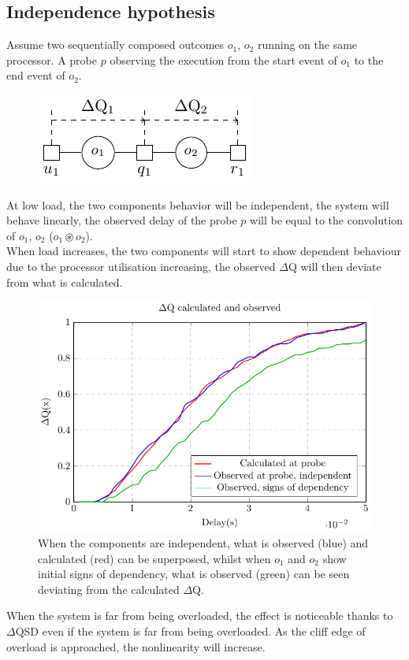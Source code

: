     \subsection{Independence hypothesis}
        
        Assume two sequentially composed outcomes $o_1$, $o_2$ running on the same processor. A probe $p$ observing the execution from the start event of $o_1$ to the end event of $o_2$. 
        \begin{figure}[H]
            \begin{center}
                \includegraphics[scale=1.6]{tikz/indep.pdf}
            \end{center}
        \end{figure}
        
        At low load, the two components behavior will be independent, the system will behave linearly, the observed delay of the probe $p$ will be equal to the convolution of $o_1$, $o_2$ ($o_1 \circledast o_2$). \\
        
        When load increases, the two components will start to show dependent behaviour due to the processor utilisation increasing, the observed $\Delta$Q will then deviate from what is calculated.
        \begin{figure}[H]
            \begin{center}
                \includegraphics[scale=1.1]{tikz/cdf_indep.pdf}
            \end{center}
            \caption{When the components are independent, what is observed (blue) and calculated (red) can be superposed, whilst when $o_1$ and $o_2$ show initial signs of dependency, what is observed (green) can be seen deviating from the calculated $\Delta$Q.}
        \end{figure}

        When the system is far from being overloaded, the effect is noticeable thanks to $\Delta$QSD even if the system is far from being overloaded. As the cliff edge of overload is approached, the nonlinearity will increase.
